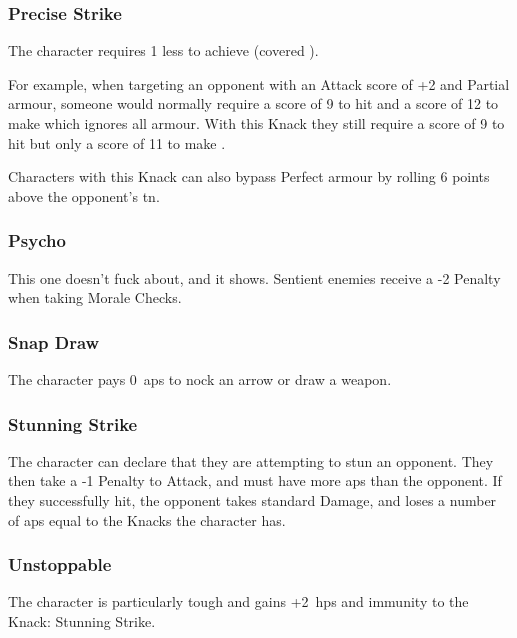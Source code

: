 \begin{multicols}{2}
\subsubsection{Precise Strike}\label{precisestrike}

The character requires 1 less to achieve  (covered ).

\begin{exampletext}
  For example, when targeting an opponent with an Attack score of +2 and Partial armour, someone would normally require a score of 9 to hit and a score of 12 to make  which ignores all armour.
  With this Knack they still require a score of 9 to hit but only a score of 11 to make .
\end{exampletext}

Characters with this Knack can also bypass Perfect armour by rolling 6 points above the opponent's \gls{tn}.

\subsubsection{Psycho}

This one doesn't fuck about, and it shows.
Sentient enemies receive a -2 Penalty when taking Morale Checks.%

\subsubsection{Snap Draw}

The character pays 0~\glspl{ap} to nock an arrow or draw a weapon.

\subsubsection{Stunning Strike}\label{stunningstrike}

The character can declare that they are attempting to stun an opponent.
They then take a -1 Penalty to Attack, and must have more \glspl{ap} than the opponent.
If they successfully hit, the opponent takes standard Damage, and loses a number of \glspl{ap} equal to the Knacks the character has.

\subsubsection{Unstoppable}

The character is particularly tough and gains +2~\glspl{hp} and immunity to the Knack: Stunning Strike.


\end{multicols}
